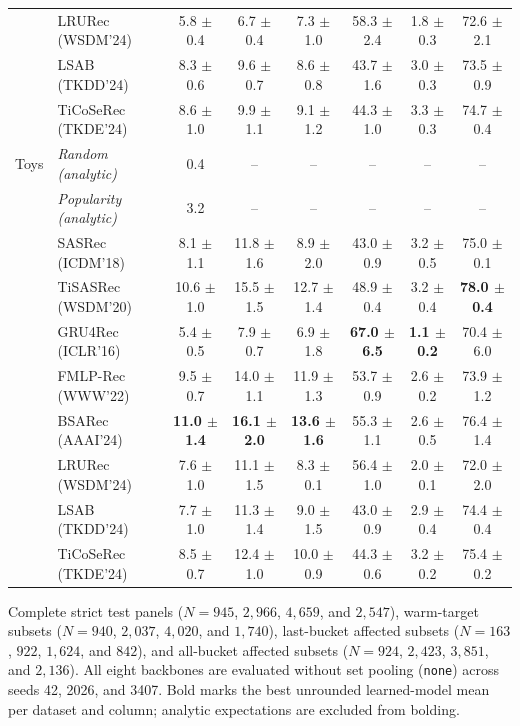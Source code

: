 \begin{table}[!htbp]
\begin{tabular*}{\textwidth}{@{\extracolsep{\fill}}llcccccc@{}}
 & LRURec (WSDM'24) & 5.8 $\pm$ 0.4 & 6.7 $\pm$ 0.4 & 7.3 $\pm$ 1.0 & 58.3 $\pm$ 2.4 & 1.8 $\pm$ 0.3 & 72.6 $\pm$ 2.1 \\
 & LSAB (TKDD'24) & 8.3 $\pm$ 0.6 & 9.6 $\pm$ 0.7 & 8.6 $\pm$ 0.8 & 43.7 $\pm$ 1.6 & 3.0 $\pm$ 0.3 & 73.5 $\pm$ 0.9 \\
 & TiCoSeRec (TKDE'24) & 8.6 $\pm$ 1.0 & 9.9 $\pm$ 1.1 & 9.1 $\pm$ 1.2 & 44.3 $\pm$ 1.0 & 3.3 $\pm$ 0.3 & 74.7 $\pm$ 0.4 \\
\midrule
Toys & \textit{Random (analytic)} & 0.4 & -- & -- & -- & -- & -- \\
 & \textit{Popularity (analytic)} & 3.2 & -- & -- & -- & -- & -- \\
 & SASRec (ICDM'18) & 8.1 $\pm$ 1.1 & 11.8 $\pm$ 1.6 & 8.9 $\pm$ 2.0 & 43.0 $\pm$ 0.9 & 3.2 $\pm$ 0.5 & 75.0 $\pm$ 0.1 \\
 & TiSASRec (WSDM'20) & 10.6 $\pm$ 1.0 & 15.5 $\pm$ 1.5 & 12.7 $\pm$ 1.4 & 48.9 $\pm$ 0.4 & 3.2 $\pm$ 0.4 & \textbf{78.0 $\pm$ 0.4} \\
 & GRU4Rec (ICLR'16) & 5.4 $\pm$ 0.5 & 7.9 $\pm$ 0.7 & 6.9 $\pm$ 1.8 & \textbf{67.0 $\pm$ 6.5} & \textbf{1.1 $\pm$ 0.2} & 70.4 $\pm$ 6.0 \\
 & FMLP-Rec (WWW'22) & 9.5 $\pm$ 0.7 & 14.0 $\pm$ 1.1 & 11.9 $\pm$ 1.3 & 53.7 $\pm$ 0.9 & 2.6 $\pm$ 0.2 & 73.9 $\pm$ 1.2 \\
 & BSARec (AAAI'24) & \textbf{11.0 $\pm$ 1.4} & \textbf{16.1 $\pm$ 2.0} & \textbf{13.6 $\pm$ 1.6} & 55.3 $\pm$ 1.1 & 2.6 $\pm$ 0.5 & 76.4 $\pm$ 1.4 \\
 & LRURec (WSDM'24) & 7.6 $\pm$ 1.0 & 11.1 $\pm$ 1.5 & 8.3 $\pm$ 0.1 & 56.4 $\pm$ 1.0 & 2.0 $\pm$ 0.1 & 72.0 $\pm$ 2.0 \\
 & LSAB (TKDD'24) & 7.7 $\pm$ 1.0 & 11.3 $\pm$ 1.4 & 9.0 $\pm$ 1.5 & 43.0 $\pm$ 0.9 & 2.9 $\pm$ 0.4 & 74.4 $\pm$ 0.4 \\
 & TiCoSeRec (TKDE'24) & 8.5 $\pm$ 0.7 & 12.4 $\pm$ 1.0 & 10.0 $\pm$ 0.9 & 44.3 $\pm$ 0.6 & 3.2 $\pm$ 0.2 & 75.4 $\pm$ 0.2 \\
\bottomrule
\end{tabular*}
\par\smallskip\noindent\begin{minipage}{\textwidth}\fontsize{8}{10}\selectfont Complete strict test panels ($N=945$, $2{,}966$, $4{,}659$, and $2{,}547$), warm-target subsets ($N=940$, $2{,}037$, $4{,}020$, and $1{,}740$), last-bucket affected subsets ($N=163$, $922$, $1{,}624$, and $842$), and all-bucket affected subsets ($N=924$, $2{,}423$, $3{,}851$, and $2{,}136$). All eight backbones are evaluated without set pooling (\texttt{none}) across seeds 42, 2026, and 3407. Bold marks the best unrounded learned-model mean per dataset and column; analytic expectations are excluded from bolding.
\end{minipage}
\end{table}
